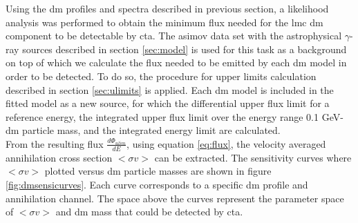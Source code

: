 \documentclass[main.tex]{subfiles}
\begin{document}
Using the \gls{dm} profiles and spectra described in previous section, a likelihood analysis was performed to obtain the minimum flux needed for the \gls{lmc} \gls{dm} component to be detectable by \gls{cta}. The asimov data set with the astrophysical $\gamma$-ray sources described in section \ref{sec:model} is used for this task as a background on top of which we calculate the flux needed to be emitted by each \gls{dm} model in order to be detected. To do so, the procedure for upper limits calculation described in section \ref{sec:ulimits} is applied. Each \gls{dm} model is included in the fitted model as a new source, for which the differential upper flux limit for a reference energy, the integrated upper flux limit over the energy range 0.1 GeV-\gls{dm} particle mass, and the integrated energy limit are calculated.\\
From the resulting flux $\frac{d \Phi_{ulim}}{dE}$, using equation \ref{eq:flux}, the velocity averaged annihilation cross section $<\sigma v>$ can be extracted. The sensitivity curves where $<\sigma v>$ plotted versus \gls{dm} particle masses are shown in figure \ref{fig:dmsensicurves}. Each curve corresponds to a specific \gls{dm} profile and annihilation channel. The space above the curves represent the parameter space of $<\sigma v>$ and \gls{dm} mass that could be detected by \gls{cta}.
\end{document}
